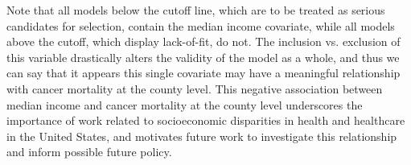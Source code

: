 		Note that all models below the cutoff line, which are to be treated as serious candidates for selection, contain the median income covariate, while all models
		above the cutoff, which display lack-of-fit, do not. The inclusion vs. exclusion of this variable drastically alters the validity of the model as a whole, and
		thus we can say that it appears this single covariate may have a meaningful relationship with cancer mortality at the county level. This negative association between
		median income and cancer mortality at the county level underscores the importance of work related to socioeconomic disparities in health and healthcare in the United States,
		and motivates future work to investigate this relationship and inform possible future policy.

